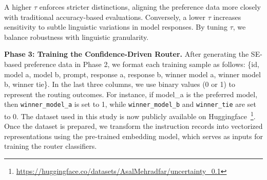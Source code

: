 A higher $\tau$ enforces stricter distinctions, aligning the preference data more closely with traditional accuracy-based evaluations. Conversely, a lower $\tau$ increases sensitivity to subtle linguistic variations in model responses. By tuning $\tau$, we balance robustness with linguistic granularity.


\noindent \textbf{Phase 3: Training the Confidence-Driven Router.}
After generating the SE-based preference data in Phase 2, we format each training sample as follows: \{id, model a, model b, prompt, response a, response b, winner model a, winner model b, winner tie\}. In the last three columns, we use binary values (0 or 1) to represent the routing outcomes. For instance, if model\_a is the preferred model, then \texttt{winner\_model\_a} is set to 1, while \texttt{winner\_model\_b} and \texttt{winner\_tie} are set to 0. The dataset used in this study is now publicly available on Huggingface~\footnote{\url{https://huggingface.co/datasets/AsalMehradfar/uncertainty_0.1}}. Once the dataset is prepared, we transform the instruction records into vectorized representations using the pre-trained embedding model, which serves as inputs for training the router classifiers.











